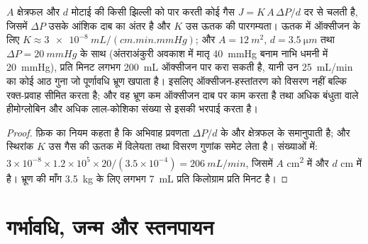 \begin{theorem}\label{thm:b2:mammal-reproduction:fick}
$A$ क्षेत्रफल और $d$ मोटाई की किसी झिल्ली को पार करती कोई गैस
$J = K\,A\,\Delta P/d$ दर से चलती है, जिसमें $\Delta P$ उसके आंशिक दाब
का अंतर है और $K$ उस ऊतक की पारगम्यता। ऊतक में ऑक्सीजन
के लिए $K \approx \qty{3e-8}{mL/(cm.min.mmHg)}$; और $A =
\qty{12}{m^2}$, $d = \qty{3.5}{\micro m}$ तथा $\Delta P =
\qty{20}{mmHg}$ के साथ (अंतराअंकुरी अवकाश में मातृ \qty{40}{mmHg}
बनाम नाभि धमनी में \qty{20}{mmHg}),  प्रति मिनट
लगभग \qty{200}{mL} ऑक्सीजन पार करा सकती है, यानी उन
\qty{25}{mL/min} का कोई आठ गुना जो पूर्णावधि भ्रूण खपाता है। इसलिए
ऑक्सीजन-हस्तांतरण को विसरण नहीं बल्कि रक्त-प्रवाह सीमित करता है; और वह
भ्रूण कम ऑक्सीजन दाब पर काम करता है तथा अधिक बंधुता वाले हीमोग्लोबिन और
अधिक लाल-कोशिका संख्या से इसकी भरपाई करता है।
\end{theorem}
\begin{proof}
फ़िक का नियम कहता है कि अभिवाह प्रवणता $\Delta P/d$ के और क्षेत्रफल के
समानुपाती है; और स्थिरांक $K$ उस गैस की ऊतक में विलेयता तथा विसरण
गुणांक समेट लेता है। संख्याओं में:
$3\times 10^{-8}\times 1.2\times 10^{5}\times 20/(3.5\times 10^{-4})
= \qty{206}{mL/min}$, जिसमें $A$ \unit{cm^2} में और $d$ \unit{cm} में है।
भ्रूण की माँग \qty{3.5}{kg} के लिए लगभग \qty{7}{mL} प्रति किलोग्राम
प्रति मिनट है।
\end{proof}

\section{गर्भावधि, जन्म और स्तनपायन}

